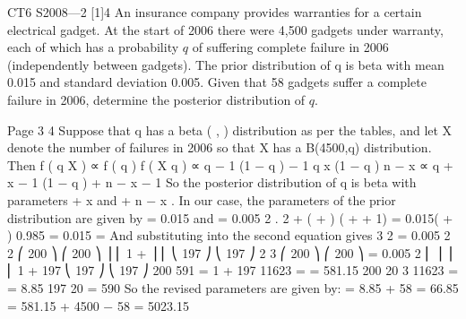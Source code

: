 \documentclass[a4paper,12pt]{article}
\begin{document}
CT6 S2008—2
[1]4 An insurance company provides warranties for a certain electrical gadget. At the start
of 2006 there were 4,500 gadgets under warranty, each of which has a probability $q$ of
suffering complete failure in 2006 (independently between gadgets). The prior
distribution of q is beta with mean 0.015 and standard deviation 0.005. Given that 58
gadgets suffer a complete failure in 2006, determine the posterior distribution of $q$.



Page 3%
4
Suppose that q has a beta ( \alpha  , \beta  ) distribution as per the tables, and let X denote the
number of failures in 2006 so that X has a B(4500,q) distribution. Then
f ( q X ) ∝ f ( q ) \times  f ( X q )
∝ q \alpha − 1 (1 − q ) \beta − 1 \times  q x (1 − q ) n − x
∝ q \alpha + x − 1 (1 − q ) \beta + n − x − 1
So the posterior distribution of q is beta with parameters \alpha  + x and \beta  + n − x .
In our case, the parameters of the prior distribution are given by
\alpha 
\alpha \beta 
= 0.015 and
= 0.005 2 .
2
\alpha +\beta 
( \alpha  + \beta  ) ( \alpha  + \beta  + 1)
\alpha  = 0.015( \alpha  + \beta  )
0.985 \alpha  = 0.015 
\alpha =
And substituting into the second equation gives
3 2
= 0.005 2
2
⎛ 200 ⎞ ⎛ 200 ⎞
\beta  ⎟ ⎜ 1 +
\beta  ⎟
⎜
⎝ 197 ⎠ ⎝ 197 ⎠
2
3
⎛ 200 ⎞ ⎛ 200 ⎞
= 0.005 2 \times  ⎜
\beta  ⎟
⎟ \times  ⎜ 1 +
197
⎝ 197 ⎠ ⎝ 197 ⎠
200
591 = 1 +
197 11623
=
= 581.15
200
20
3 11623
\alpha =
\times 
= 8.85
197
20
\beta  = 590 \times 
So the revised parameters are given by:
\alpha  * = 8.85 + 58 = 66.85
\beta  * = 581.15 + 4500 − 58 = 5023.15
\end{document}
